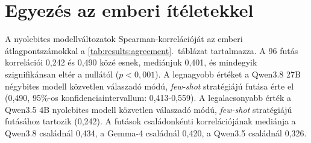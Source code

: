 \documentclass[
]{elteikthesis}[2024/04/26]
\begin{document}
\section{Egyezés az emberi ítéletekkel}
\label{sec:results:agreement}

A nyolcbites modellváltozatok Spearman-korrelációját az emberi
átlagpontszámokkal a \ref{tab:results:agreement}.~táblázat tartalmazza. A 96
futás korrelációi 0,242 és 0,490 közé esnek, mediánjuk 0,401, és mindegyik %
szignifikánsan eltér a nullától ($p < 0{,}001$). A legnagyobb értéket a Qwen3.8
27B négybites modell közvetlen válaszadó módú, \textit{few-shot} stratégiájú
futása érte el (0,490, 95\%-os konfidenciaintervallum: 0,413-0,559). A
legalacsonyabb érték a Qwen3.5 4B nyolcbites modell közvetlen válaszadó módú,
\textit{few-shot} stratégiájú futásához tartozik (0,242). A futások
családonkénti korrelációjának mediánja a Qwen3.8 családnál 0,434, a Gemma-4
családnál 0,420, a Qwen3.5 családnál 0,326.
\end{document}
